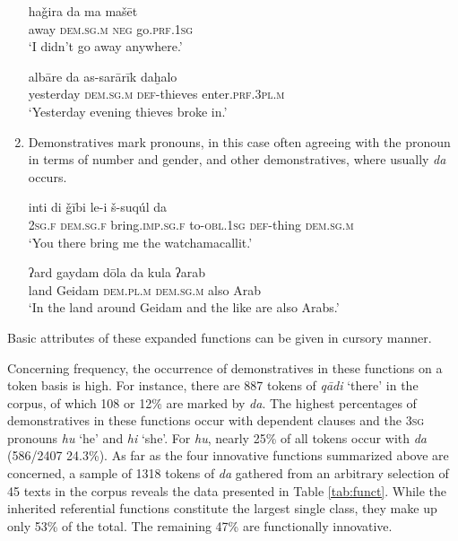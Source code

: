 \documentclass[output=paper]{langsci/langscibook}
\begin{document}
\begin{enumerate}[leftmargin=*]
\ea\label{hajira} 
\gll haǧira da ma mašēt\\
     away \textsc{dem.sg.m} \textsc{neg} go.\textsc{prf.1sg}\\
\glt ‘I didn’t go away anywhere.’
\z

\ea\label{albare}
\gll albāre da as-sarārīk daḫalo\\
     yesterday \textsc{dem.sg.m} \textsc{def-}thieves enter.\textsc{prf.3pl.m}\\
\glt ‘Yesterday evening thieves broke in.’
\z

\item Demonstratives mark pronouns, in this case often agreeing with the pronoun in terms of number and gender, and other demonstratives, where usually \textit{da} occurs.

\ea\label{suqul}
\ea
\gll inti di ǧībi le-i š-suqúl da\\
     \textsc{2sg.f} \textsc{dem.sg.f} bring.\textsc{imp.sg.f} to-\textsc{obl.1sg} \textsc{def-}thing \textsc{dem.sg.m}\\
\glt ‘You there bring me the watchamacallit.’
\z

\ea\label{ard}  
\gll ʔard gaydam dōla da kula ʔarab\\
     land Geidam \textsc{dem.pl.m} \textsc{dem.sg.m} also Arab\\
\glt ‘In the land around Geidam and the like are also Arabs.’
\z
\z

\end{enumerate}

\noindent Basic attributes of these expanded functions can be given in cursory manner.

Concerning frequency, the occurrence of demonstratives in these functions on a token basis is high. For instance, there are 887 tokens of \textit{qādi} ‘there’ in the corpus, of which 108 or 12\% are marked by \textit{da}. The highest percentages of demonstratives in these functions occur with dependent clauses and the 3\textsc{sg} pronouns \textit{hu} ‘he’ and \textit{hi} ‘she’. For \textit{hu}, nearly 25\% of all tokens occur with \textit{da} (586/2407 24.3\%). As far as the four innovative functions summarized above are concerned, a sample of 1318 tokens of \textit{da} gathered from an arbitrary selection of 45 texts in the corpus reveals the data presented in Table \ref{tab:funct}. While the inherited referential functions constitute the largest single class, they make up only 53\% of the total. The remaining 47\% are functionally innovative.
\end{document}
